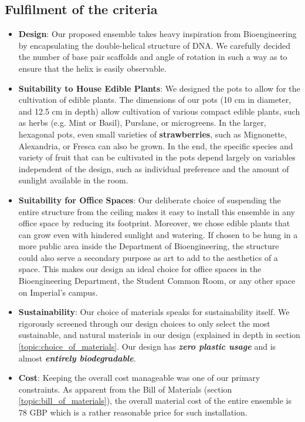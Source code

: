\documentclass[12pt]{extarticle} %
\begin{document}
\subsection{Fulfilment of the criteria}
\begin{itemize}
    \item \textbf{Design}: Our proposed ensemble takes heavy inspiration from Bioengineering by encapsulating the double-helical structure of DNA. We carefully decided the number of base pair scaffolds and angle of rotation in such a way as to ensure that the helix is easily observable.
    \item \textbf{Suitability to House Edible Plants}: We designed the pots to allow for the cultivation of edible plants. The dimensions of our
pots (10 cm in diameter, and 12.5 cm in depth) allow cultivation of various compact edible plants, such as herbs (e.g. Mint or Basil), Purslane, or microgreens. In the larger, hexagonal pots, even small varieties of \textbf{strawberries}, such as Mignonette, Alexandria, or
Fresca can also be grown. In the end, the specific species and variety of fruit that can be cultivated in the pots depend largely on variables independent of the design, such as individual preference and the amount of sunlight available in the room.
\item \textbf{Suitability for Office Spaces}: Our deliberate choice of suspending the entire structure from the ceiling makes it easy to install this ensemble in any office space by reducing its footprint. Moreover, we chose edible plants that can grow even with hindered sunlight and watering. If chosen to be hung in a more public area inside the Department of Bioengineering, the structure could also serve a secondary purpose as art to add to the aesthetics of a space. This makes our design an ideal choice for office spaces in the Bioengineering Department, the Student Common Room, or any other space on Imperial's campus.
\item \textbf{Sustainability}: Our choice of materials speaks for sustainability itself. We rigorously screened through our design choices to only select the most sustainable, and natural materials in our design (explained in depth in section \ref{topic:choice_of_materials}. Our design has \textbf{\textit{zero plastic usage}} and is almost \textbf{\textit{entirely biodegradable}}. 
\item \textbf{Cost}: Keeping the overall cost manageable was one of our primary constraints. As apparent from the Bill of Materials (section \ref{topic:bill_of_materials}), the overall material cost of the entire ensemble is 78 GBP which is a rather reasonable price for such installation. 

\end{itemize}
\end{document}
